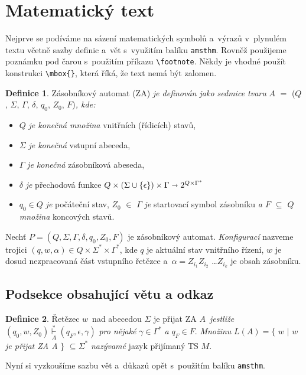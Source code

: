 \documentclass[a4paper, titlepage, twocolumn, 11pt]{article}
\theoremstyle{definition}
\newtheorem{defn}{Definice}
\theoremstyle{sentence}
\begin{document}
\section{Matematický text}
Nejprve se podíváme na sázení matematických symbolů a~výrazů v~plynulém textu včetně sazby definic a~vět s~využitím balíku \verb|amsthm|. Rovněž použijeme poznámku pod čarou s~použitím příkazu \verb|\footnote|. Někdy je vhodné použít konstrukci \verb|\mbox{}|, která říká, že text nemá být zalomen.
\par
\begin{defn}\label{def:defone}
Zásobníkový automat (ZA) \emph{je definován jako sedmice tvaru} $A$ $=$ ($Q$, $\Sigma$, $\Gamma$, $\delta$, $q_0$, $Z_0$, $F$)\emph{, kde: }

  \begin{itemize}
    \item $Q$ \emph{je konečná množina} vnitřních (řídicích) stavů,
    \item $\Sigma$ \emph{je konečná} vstupní abeceda,
    \item $\Gamma$ \emph{je konečná} zásobníková abeseda,
    \item $\delta$ \emph{je} přechodová funkce $Q\times(\Sigma \cup {\{\epsilon\}}) \times \Gamma\shortrightarrow 2^{Q\times\Gamma^\ast}$
    \item $q_0 \in Q$ \emph{je} počáteční stav, $Z_0$ $\in$ $\Gamma$ \emph{je} startovací symbol zásobníku \emph{a $F$ $\subseteq$ $Q$ množina} koncových stavů.

  \end{itemize}

  Nechť $P = (Q, \Sigma, \Gamma, \delta, q_0, Z_0, F)$ je zásobníkový automat. \emph{Konfigurací} nazveme trojici $(q, w, \alpha) \in Q \times \Sigma^\ast \times \Gamma^\ast$, kde $q$ je aktuální stav vnitřního řízení, $w$ je dosud nezpracovaná část vstupního řetězce a~$\alpha = Z_{i_1} Z_{i_2}$ \ldots $Z_{i_k}$ je obsah zásobníku\footnotemark[1].

\end{defn}
\subsection{Podsekce obsahující větu a odkaz}
\begin{defn}\label{def:deftwo}
Řetězec $w$~nad abecedou $\Sigma$ je přijat ZA $A$~\emph{jestliže} $(q_0, w, Z_0) \overset{\ast}{\underset{A}{\vdash}} (q_F, \epsilon, \gamma)$ \emph{pro nějaké} $\gamma \in \Gamma^\ast$ \emph{a} $q_F \in F$. \emph{Množinu} $L(A) = \{$ $w$ $|$ $w $ \emph{je přijat ZA A} $\}$ $\subseteq \Sigma^\ast$ \emph{nazývamé} jazyk přijímaný TS $M$.
\par
\setlength{\parskip}{1em}
Nyní si vyzkoušíme sazbu vět a~důkazů opět s~použitím balíku \verb|amsthm|.
\end{defn}
\medbreak
\end{document}
